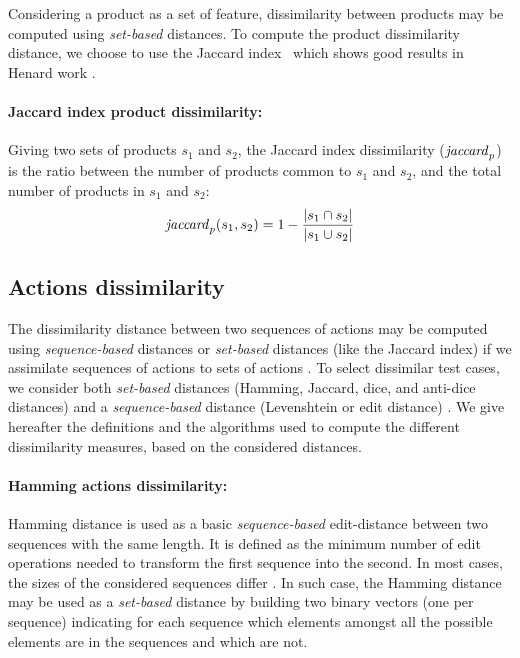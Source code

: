 Considering a product as a set of feature, dissimilarity between products may be computed using \emph{set-based} distances. To compute the product dissimilarity distance, we choose to use the Jaccard index~\cite{Jaccard1901} which shows good results in Henard \etal work \cite{Henard2014a}. 

\paragraph{Jaccard index product dissimilarity:}

Giving two sets of products $s_1$ and $s_2$, the Jaccard index dissimilarity ($\mathit{jaccard}_p$) is the ratio between the number of products common to $s_1$ and $s_2$, and the total number of products in $s_1$ and $s_2$:
$$\mathit{jaccard}_p(s_1, s_2) = 1 - \frac{\vert s_1 \cap s_2 \vert}{\vert s_1 \cup s_2 \vert}$$


\subsection{Actions dissimilarity}

The dissimilarity distance between two sequences of actions may be computed using \emph{sequence-based} distances or \emph{set-based} distances (like the Jaccard index) if we assimilate sequences of actions to sets of actions \cite{Hemmati2010,Hemmati2013}. To select dissimilar test cases, we consider both \emph{set-based} distances (Hamming, Jaccard, dice, and anti-dice distances) and a \emph{sequence-based} distance (Levenshtein or edit distance) \cite{Gusfield1997}. We give hereafter the definitions and the algorithms used to compute the different dissimilarity measures, based on the considered distances.

\paragraph{Hamming actions dissimilarity:}

Hamming distance \cite{Sankoff1983} is used as a basic \emph{se\-quen\-ce-based} edit-distance between two sequences with the same length. It is defined as the minimum number of edit operations needed to transform the first sequence into the second. In most cases, the sizes of the considered sequences differ \cite{Hemmati2010,Hemmati2013}. In such case, the Hamming distance may be used as a \emph{set-based} distance by building two binary vectors (one per sequence) indicating for each sequence which elements amongst all the possible elements are in the sequences and which are not. 

